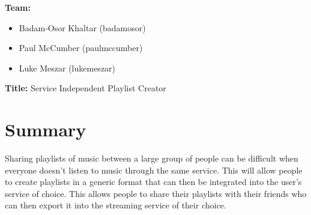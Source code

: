 \documentclass[12pt]{article}
\begin{document}
	\noindent
	\textbf{Team:}
   	 \begin{itemize}[leftmargin=0.0cm,labelsep=0.2cm]
   	 	\item[] Badam-Osor Khaltar (badamosor)
   	 	\item[] Paul McCumber (paulmccumber)
   	 	\item[] Luke Meszar (lukemeszar)
   	 \end{itemize}
    \noindent
    \textbf{Title:} Service Independent Playlist Creator
	\section{Summary}
	Sharing playlists of music between a large group of people can be difficult when
	everyone doesn't listen to music through the same service. This will allow people to create
	playlists in a generic format that can then be integrated into the user’s service of choice. This allows people to share their playlists with their friends who can then export it into the streaming service of their choice. 
\end{document}
